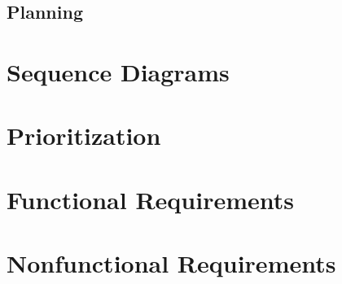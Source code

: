 \subsection{Planning}
\section{Sequence Diagrams}
\section{Prioritization}
\section{Functional Requirements}
\section{Nonfunctional Requirements}

